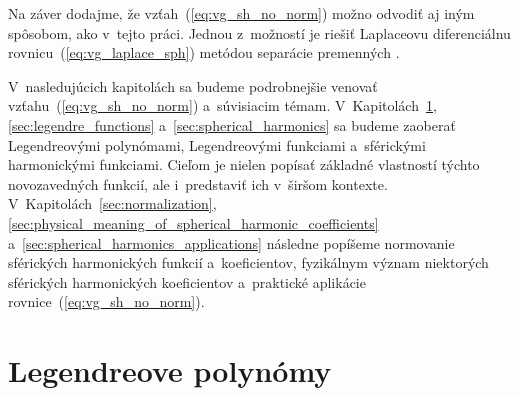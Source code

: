 \documentclass[a4paper, 12pt]{book}
\begin{document}
Na záver dodajme, že vzťah~(\ref{eq:vg_sh_no_norm}) možno odvodiť aj iným
spôsobom, ako v~tejto práci.  Jednou z~možností je riešiť Laplaceovu
diferenciálnu rovnicu~(\ref{eq:vg_laplace_sph}) metódou separácie premenných
\citep[napríklad][]{MoritzPhysicalGeodesy,Janak2006}.

V~nasledujúcich kapitolách sa budeme podrobnejšie venovať
vzťahu~(\ref{eq:vg_sh_no_norm}) a~súvisiacim témam.
V~Kapitolách~\ref{sec:legendre_polynomials}, \ref{sec:legendre_functions}
a~\ref{sec:spherical_harmonics} sa budeme zaoberať Legendreovými polynómami,
Legendreovými funkciami a~sférickými harmonickými funkciami.  Cieľom je nielen
popísať základné vlastností týchto novozavedných funkcií, ale i~predstaviť ich
v~širšom kontexte.  V~Kapitolách~\ref{sec:normalization},
\ref{sec:physical_meaning_of_spherical_harmonic_coefficients}
a~\ref{sec:spherical_harmonics_applications} následne popíšeme normovanie
sférických harmonických funkcií a~koeficientov, fyzikálnym význam niektorých
sférických harmonických koeficientov a~praktické aplikácie
rovnice~(\ref{eq:vg_sh_no_norm}).






\section{Legendreove polynómy}
\label{sec:legendre_polynomials}
\end{document}

